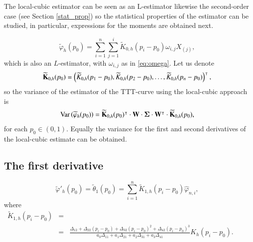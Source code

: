 \documentclass[preprint,12pt]{elsarticle}
\begin{document}
\bigskip

The local-cubic estimator can be seen as an L-estimator likewise the second-order case (see Section \ref{stat_prop}) so the statistical properties of the estimator can be studied,  in particular, expressions for the moments are obtained next.

\begin{equation*}
\widetilde{\varphi}_h(p_0)= \sum_{i=1}^n \sum_{j=1}^i \widetilde{K}_{0,h}(p_i-p_0)\omega_{i,j}X_{(j)},
\end{equation*}
which is also an $L$-estimator, with $\omega_{i,j}$ as in \eqref{eq:omega}. Let us denote 
$$\widetilde{\bf K}_{0,h}(p_0)=\left(\widetilde{ K}_{0,h}(p_1-p_0), \widetilde{ K}_{0,h}(p_2-p_0),\ldots,\widetilde{ K}_{0,h}(p_n-p_0)\right)^{\intercal},$$
 so the variance of the estimator of the TTT-curve using the local-cubic approach is
\begin{equation}\label{V.phi0.cubic}
{\rm Var} \left(\widetilde{\varphi}_h(p_0)\right)= \widetilde{\bf K}_{0,h}(p_0)^{\intercal}\cdot {\bf W} \cdot {\boldsymbol{\Sigma}}\cdot  {\bf W}^{\intercal}\cdot \widetilde{\bf K}_{0,h}(p_0),
\end{equation}
for each $p_0 \in (0,1)$. Equally the variance for the first and second derivatives of the local-cubic estimate can be obtained.
 

\subsection{The first derivative} %
\begin{equation}\label{dphi.cub}
\widetilde{\varphi}'_h(p_0)=\widetilde{\theta}_1(p_0)= \sum_{i=1}^n \widetilde{K}_{1,h}\left(p_i-p_0\right) \widehat{\varphi}_{n,i},
\end{equation}
where
\begin{eqnarray*}
\widetilde{K}_{1,h}\left(p_i-p_0\right)&=& \\
&=&\frac{\Delta_{12}+\Delta_{22}\left(p_i-p_0 \right)+\Delta_{32}\left(p_i-p_0 \right)^2+\Delta_{42}\left(p_i-p_0 \right)^3}{a_0 \Delta_{11}+ a_1 \Delta_{21}+a_2 \Delta_{31}+a_3 \Delta_{41}}  K_h\left(p_i-p_0\right). \qquad
\end{eqnarray*}
\end{document}
